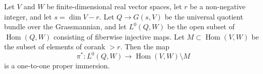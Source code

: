 Let $V$ and $W$ be finite-dimensional real vector spaces, let $r$ be a non-negative integer, and let $s = \dim V - r$. Let $Q \to G(s, V)$ be the universal quotient bundle over the Grassmannian, and let $L^0(Q, W)$ be the open subset of $\operatorname{Hom}(Q, W)$ consisting of fiberwise injective maps. Let $M \subset \operatorname{Hom}(V, W)$ be the subset of elements of corank $> r$. Then the map
$$
\pi^*: L^0(Q, W) \to \operatorname{Hom}(V, W) \setminus M
$$
is a one-to-one proper immersion.
